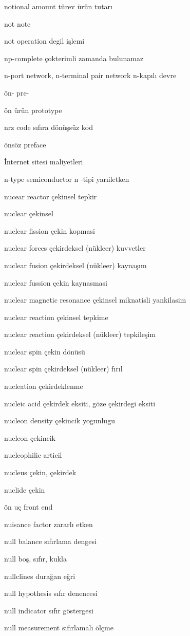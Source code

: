 \documentclass[12pt,fleqn]{article}\usepackage{../../common}
\begin{document}
notional amount türev ürün tutarı

not note

not operation degil işlemi

np-complete çokterimli zamanda bulunamaz

n-port network, n-terminal pair network n-kapılı devre

ön- pre-

ön ürün prototype

nrz code sıfıra dönüşsüz kod

önsöz preface

İnternet sitesi maliyetleri

n-type semiconductor n -tipi yarıiletken

nucear reactor çekinsel tepkir

nuclear çekinsel

nuclear fission çekin kopmasi

nuclear forces çekirdeksel (nükleer) kuvvetler

nuclear fusion çekirdeksel (nükleer) kaynaşım

nuclear fussion çekin kaynasmasi

nuclear magnetic resonance çekinsel miknatisli yankilasim

nuclear reaction çekinsel tepkime

nuclear reaction çekirdeksel (nükleer) tepkileşim

nuclear spin çekin dönüsü

nuclear spin çekirdeksel (nükleer) fırıl

nucleation çekirdeklenme

nucleic acid çekirdek eksiti, göze çekirdegi eksiti

nucleon density çekincik yogunlugu

nucleon çekincik

nucleophilic articil

nucleus çekin, çekirdek

nuclide çekin

ön uç front end

nuisance factor zararlı etken

null balance sıfırlama dengesi

null boş, sıfır, kukla

nullclines durağan eğri

null hypothesis sıfır denencesi

null indicator sıfır göstergesi

null measurement sıfırlamalı ölçme
\end{document}
